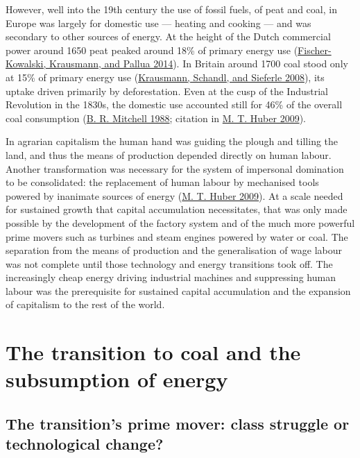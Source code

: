 \documentclass[a4paper, nobind]{templates/ociamthesis}
\begin{document}
However, well into the 19th century the use of fossil fuels, of peat and coal, in Europe was largely for domestic use --- heating and cooking --- and was secondary to other sources of energy. At the height of the Dutch commercial power around 1650 peat peaked around 18\% of primary energy use (\protect\hyperlink{ref-fischer-kowalski_sociometabolic_2014}{Fischer-Kowalski, Krausmann, and Pallua 2014}). In Britain around 1700 coal stood only at 15\% of primary energy use (\protect\hyperlink{ref-krausmann_socio-ecological_2008}{Krausmann, Schandl, and Sieferle 2008}), its uptake driven primarily by deforestation. Even at the cusp of the Industrial Revolution in the 1830s, the domestic use accounted still for 46\% of the overall coal consumption (\protect\hyperlink{ref-mitchell_british_1988}{B. R. Mitchell 1988}; citation in \protect\hyperlink{ref-huber_energizing_2009}{M. T. Huber 2009}).

In agrarian capitalism the human hand was guiding the plough and tilling the land, and thus the means of production depended directly on human labour. Another transformation was necessary for the system of impersonal domination to be consolidated: the replacement of human labour by mechanised tools powered by inanimate sources of energy (\protect\hyperlink{ref-huber_energizing_2009}{M. T. Huber 2009}). At a scale needed for sustained growth that capital accumulation necessitates, that was only made possible by the development of the factory system and of the much more powerful prime movers such as turbines and steam engines powered by water or coal. The separation from the means of production and the generalisation of wage labour was not complete until those technology and energy transitions took off. The increasingly cheap energy driving industrial machines and suppressing human labour was the prerequisite for sustained capital accumulation and the expansion of capitalism to the rest of the world.

\hypertarget{the-transition-to-coal-and-the-subsumption-of-energy}{%
\section{The transition to coal and the subsumption of energy}\label{the-transition-to-coal-and-the-subsumption-of-energy}}

\hypertarget{the-transitions-prime-mover-class-struggle-or-technological-change}{%
\subsection{The transition's prime mover: class struggle or technological change?}\label{the-transitions-prime-mover-class-struggle-or-technological-change}}
\end{document}
